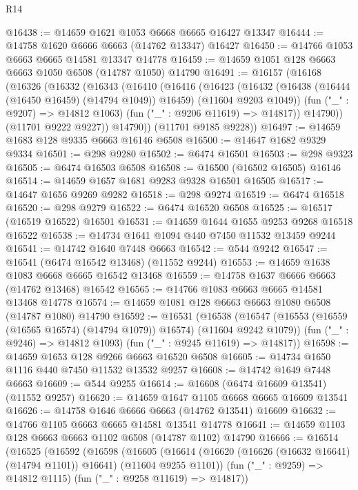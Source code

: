 \begin{lexlean}{R14}
\begin{coremodule}
@16438 := @14659 @1621 @1053 @6668 @6665 @16427 @13347
@16444 := @14758 @1620 @6666 @6663 (@14762 @13347) @16427
@16450 := @14766 @1053 @6663 @6665 @14581 @13347 @14778
@16459 := @14659 @1051 @128 @6663 @6663 @1050 @6508 (@14787 @1050) @14790
@16491 := @16157
    (@16168
      (@16326
        (@16332
          (@16343
            (@16410
              (@16416
                (@16423
                  (@16432
                    (@16438 (@16444 (@16450 @16459) (@14794 @1049)) @16459)
                    (@11604 @9203 @1049))
                  (fun ("_" : @9207) => @14812 @1063)
                  (fun ("_" : @9206 @11619) => @14817))
                @14790))
            (@11701 @9222 @9227))
          @14790))
      (@11701 @9185 @9228))
@16497 := @14659 @1683 @128 @9335 @6663 @16146 @6508
@16500 := @14647 @1682 @9329 @9334
@16501 := @298 @9280
@16502 := @6474 @16501
@16503 := @298 @9323
@16505 := @6474 @16503 @6508
@16508 := @16500 (@16502 @16505) @16146
@16514 := @14659 @1657 @1681 @9283 @9328 @16501 @16505
@16517 := @14647 @1656 @9269 @9282
@16518 := @298 @9274
@16519 := @6474 @16518
@16520 := @298 @9279
@16522 := @6474 @16520 @6508
@16525 := @16517 (@16519 @16522) @16501
@16531 := @14659 @1644 @1655 @9253 @9268 @16518 @16522
@16538 := @14734 @1641 @1094 @440 @7450 @11532 @13459 @9244
@16541 := @14742 @1640 @7448 @6663
@16542 := @544 @9242
@16547 := @16541 (@6474 @16542 @13468) (@11552 @9244)
@16553 := @14659 @1638 @1083 @6668 @6665 @16542 @13468
@16559 := @14758 @1637 @6666 @6663 (@14762 @13468) @16542
@16565 := @14766 @1083 @6663 @6665 @14581 @13468 @14778
@16574 := @14659 @1081 @128 @6663 @6663 @1080 @6508 (@14787 @1080) @14790
@16592 := @16531
    (@16538
      (@16547 (@16553 (@16559 (@16565 @16574) (@14794 @1079)) @16574) (@11604 @9242 @1079))
      (fun ("_" : @9246) => @14812 @1093)
      (fun ("_" : @9245 @11619) => @14817))
@16598 := @14659 @1653 @128 @9266 @6663 @16520 @6508
@16605 := @14734 @1650 @1116 @440 @7450 @11532 @13532 @9257
@16608 := @14742 @1649 @7448 @6663
@16609 := @544 @9255
@16614 := @16608 (@6474 @16609 @13541) (@11552 @9257)
@16620 := @14659 @1647 @1105 @6668 @6665 @16609 @13541
@16626 := @14758 @1646 @6666 @6663 (@14762 @13541) @16609
@16632 := @14766 @1105 @6663 @6665 @14581 @13541 @14778
@16641 := @14659 @1103 @128 @6663 @6663 @1102 @6508 (@14787 @1102) @14790
@16666 := @16514
    (@16525
      (@16592
        (@16598
          (@16605
            (@16614 (@16620 (@16626 (@16632 @16641) (@14794 @1101)) @16641) (@11604 @9255 @1101))
            (fun ("_" : @9259) => @14812 @1115)
            (fun ("_" : @9258 @11619) => @14817))

\end{coremodule}
\end{lexlean}
